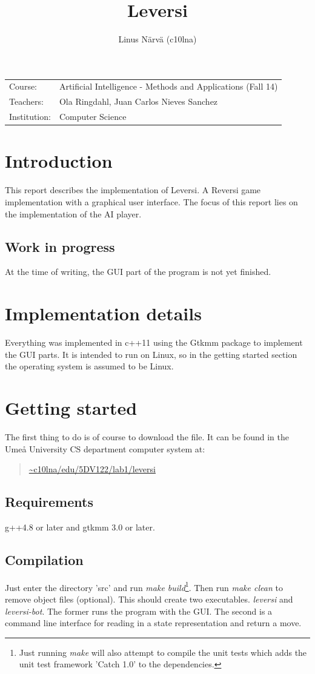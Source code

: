 \documentclass[a4paper,11pt]{article}
\title{Leversi}
\author{Linus Närvä (c10lna)}
\begin{document}
\maketitle

\begin{tabular}{l l}
Course: & Artificial Intelligence - Methods and Applications (Fall 14) \\
Teachers: & Ola Ringdahl, Juan Carlos Nieves Sanchez \\
Institution: & Computer Science \\
\end{tabular}

\section{Introduction}
This report describes the implementation of Leversi. A Reversi game implementation with a graphical user interface. The focus of this report lies on the implementation of the AI player.

\subsection{Work in progress}
At the time of writing, the GUI part of the program is not yet finished.

\section{Implementation details}
Everything was implemented in c++11 using the Gtkmm package to implement the GUI parts. It is intended to run on Linux, so in the getting started section the operating system is assumed to be Linux.

\section{Getting started}
The first thing to do is of course to download the file. It can be found in the Umeå University CS department computer system at:
\begin{quotation}
\url{~c10lna/edu/5DV122/lab1/leversi}
\end{quotation}

\subsection{Requirements}
g++4.8 or later and gtkmm 3.0 or later.

\subsection{Compilation}
Just enter the directory 'src' and run \textit{make build}\footnote{Just running \textit{make} will also attempt to compile the unit tests which adds the unit test framework 'Catch 1.0' to the dependencies.}. Then run \textit{make clean} to remove object files (optional). This should create two executables. \textit{leversi} and \textit{leversi-bot}. The former runs the program with the GUI. The second is a command line interface for reading in a state representation and return a move.
\end{document}

